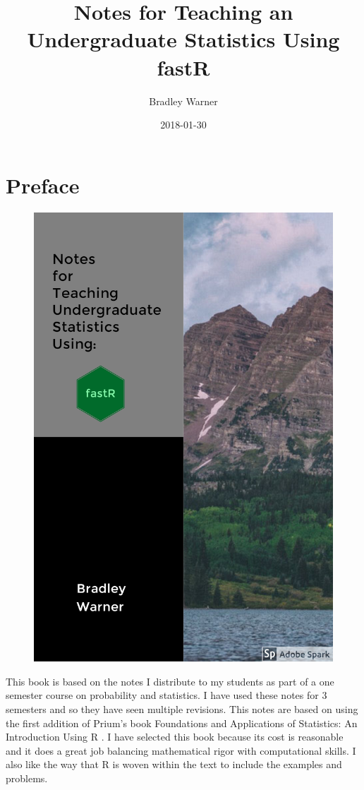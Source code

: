 \documentclass[]{book}
\title{Notes for Teaching an Undergraduate Statistics Using fastR}
\author{Bradley Warner}
\date{2018-01-30}
\theoremstyle{definition}
\theoremstyle{definition}
\theoremstyle{definition}
\theoremstyle{remark}
\begin{document}
\maketitle

{
\setcounter{tocdepth}{1}
\tableofcontents
}
\chapter*{Preface}\label{preface}

\begin{figure}
\centering
\includegraphics{./images/Cover3.jpg}
\caption{}
\end{figure}

This book is based on the notes I distribute to my students as part of a
one semester course on probability and statistics. I have used these
notes for 3 semesters and so they have seen multiple revisions. This
notes are based on using the first addition of Prium's book Foundations
and Applications of Statistics: An Introduction Using R
\citeyearpar{pruim2011foundations}. I have selected this book because
its cost is reasonable and it does a great job balancing mathematical
rigor with computational skills. I also like the way that R is woven
within the text to include the examples and problems.
\end{document}
